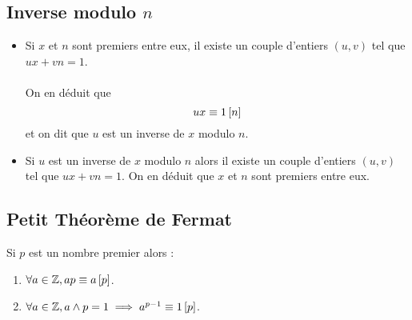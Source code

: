 \subsection{Inverse modulo \(n\)}
\begin{defprop}
	\begin{itemize}
		\item Si \(x\) et \(n\) sont premiers entre eux, il existe un couple d’entiers \((u, v)\) tel que \(ux + vn = 1\).\\~\\
		      On en déduit que
		      \[ux \equiv 1 \left[n\right]\]
		      et on dit que \(u\) est un inverse de \(x\) modulo \(n\).
		\item Si \(u\) est un inverse de \(x\) modulo \(n\) alors il existe un couple d’entiers \((u, v)\) tel que \(ux + vn = 1\).
		      On en déduit que \(x\) et \(n\) sont premiers entre eux.
	\end{itemize}
\end{defprop}

\subsection{Petit Théorème de Fermat}
\begin{theo}
	Si \(p\) est un nombre premier alors :
	\begin{enumerate}
		\item \(\forall a \in \mathbb{Z}, ap \equiv a \left[p\right]\).
		\item \(\forall a \in \mathbb{Z}, a \wedge p = 1 \implies a^{p-1} \equiv 1 \left[p\right]\).
	\end{enumerate}
\end{theo}
